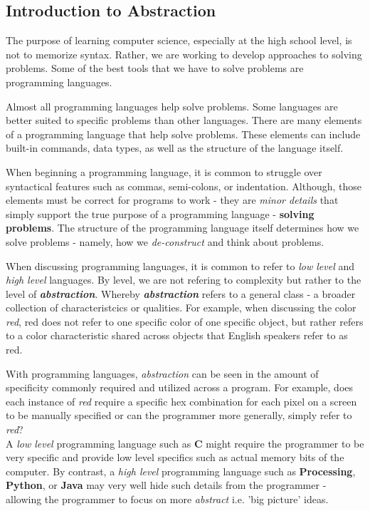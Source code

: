 \documentclass{article}
\begin{document}
\begin{flushleft}
  \section{Introduction to Abstraction}
  \setlength{\parindent}{5ex}
  The purpose of learning computer science, especially at the high school level, is not to memorize syntax. Rather, we are working to develop approaches to solving problems. Some of the best tools that we have to solve problems are programming languages.\par
  Almost all programming languages help solve problems. Some languages are better suited to specific problems than other languages. There are many elements of a programming language that help solve problems. These elements can include built-in commands, data types, as well as the structure of the language itself.\par
  When beginning a programming language, it is common to struggle over syntactical features such as commas, semi-colons, or indentation. Although, those elements must be correct for programs to work - they are \textit{minor details} that simply support the true purpose of a programming language - \textbf{solving problems}. The structure of the programming language itself determines how we solve problems - namely, how we \textit{de-construct} and think about problems. \par
  When discussing programming languages, it is common to refer to \textit{low level} and \textit{high level} languages. By level, we are not refering to complexity but rather to the level of \textit{\textbf{abstraction}}. Whereby \textit{\textbf{abstraction}} refers to a general class - a broader collection of characteristcics or qualities. For example, when discussing the color \textit{red}, red does not refer to one specific color of one specific object, but rather refers to a color characteristic shared across objects that English speakers refer to as red. \par
  With programming languages, \textit{abstraction} can be seen in the amount of specificity commonly required and utilized across a program. For example, does each instance of \textit{red} require a specific hex combination for each pixel on a screen to be manually specified or can the programmer more generally, simply refer to \textit{red}?\\
  A \textit{low level} programming language such as \textbf{C} might require the programmer to be very specific and provide low level specifics such as actual memory bits of the computer. By contrast, a \textit{high level} programming language such as \textbf{Processing}, \textbf{Python}, or \textbf{Java} may very well hide such details from the programmer - allowing the programmer to focus on more \textit{abstract} i.e. 'big picture' ideas. \par

\end{flushleft}
\end{document}
